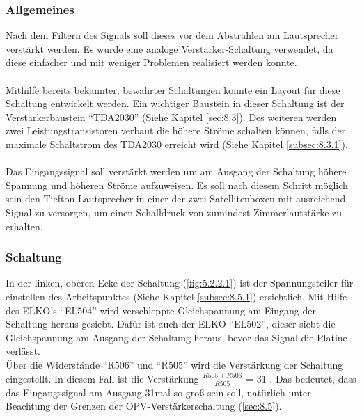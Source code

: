 \subsubsection{Allgemeines}\label{subsec:5.2.1}
Nach dem Filtern des Signals soll dieses vor dem Abstrahlen am Lautsprecher verstärkt werden.
Es wurde eine analoge Verstärker-Schaltung verwendet, da diese einfacher und mit weniger Problemen realisiert werden konnte.
\\ \\
Mithilfe bereits bekannter, bewährter Schaltungen konnte ein Layout für diese Schaltung entwickelt werden.
Ein wichtiger Baustein in dieser Schaltung ist der Verstärkerbaustein \enquote{TDA2030} (Siehe Kapitel \ref{sec:8.3}).
Des weiteren werden zwei Leistungstransistoren verbaut die höhere Ströme schalten können, falls der maximale Schaltstrom des TDA2030 erreicht wird (Siehe Kapitel \ref{subsec:8.3.1}).
\\ \\
Das Eingangssignal soll verstärkt werden um am Ausgang der Schaltung höhere Spannung und höheren Ströme aufzuweisen.
Es soll nach diesem Schritt möglich sein den Tiefton-Lautsprecher in einer der zwei Satellitenboxen mit ausreichend Signal zu versorgen, um einen Schalldruck von zumindest Zimmerlautstärke zu erhalten. 

\newpage
\subsubsection{Schaltung}\label{subsec:5.2.2}
In der linken, oberen Ecke der Schaltung (\ref{fig:5.2.2.1}) ist der Spannungsteiler für einstellen des Arbeitspunktes (Siehe Kapitel \ref{subsec:8.5.1}) ersichtlich.
Mit Hilfe des ELKO's \enquote{EL504} wird verschleppte Gleichspannung am Eingang der Schaltung heraus gesiebt.
Dafür ist auch der ELKO \enquote{EL502}, dieser siebt die Gleichspannung am Ausgang der Schaltung heraus, bevor das Signal die Platine verlässt. \\
Über die Widerstände \enquote{R506} und \enquote{R505} wird die Verstärkung der Schaltung eingestellt.
In diesem Fall ist die Verstärkung $\frac{R505+R506}{R505}$ = 31 .
Das bedeutet, dass das Eingangssignal am Ausgang 31mal so groß sein soll, natürlich unter Beachtung der Grenzen der OPV-Verstärkerschaltung (\ref{sec:8.5}).


